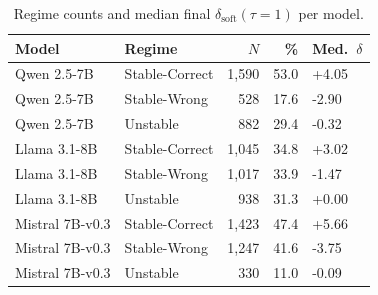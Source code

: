 \begin{table}[t]
  \caption{Regime counts and median final $\delta_{\mathrm{soft}}(\tau{=}1)$ per model.}
  \label{tab:regimes}
  \vskip 0.1in
  \begin{center}\begin{small}\begin{tabular}{llrrl}
    \toprule
    Model & Regime & $N$ & {\%} & Med.\ $\delta$ \\
    \midrule
    Qwen 2.5-7B & Stable-Correct & 1,590 & 53.0 & +4.05 \\
    Qwen 2.5-7B & Stable-Wrong & 528 & 17.6 & -2.90 \\
    Qwen 2.5-7B & Unstable & 882 & 29.4 & -0.32 \\
    Llama 3.1-8B & Stable-Correct & 1,045 & 34.8 & +3.02 \\
    Llama 3.1-8B & Stable-Wrong & 1,017 & 33.9 & -1.47 \\
    Llama 3.1-8B & Unstable & 938 & 31.3 & +0.00 \\
    Mistral 7B-v0.3 & Stable-Correct & 1,423 & 47.4 & +5.66 \\
    Mistral 7B-v0.3 & Stable-Wrong & 1,247 & 41.6 & -3.75 \\
    Mistral 7B-v0.3 & Unstable & 330 & 11.0 & -0.09 \\
    \bottomrule
  \end{tabular}\end{small}\end{center}
\end{table}
